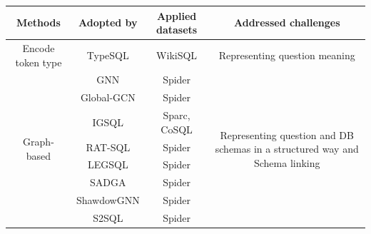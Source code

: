 \begin{table}
    \centering
    \begin{tabular}{|c|c|c|c|}
        \hline
        \rowcolor{Gray}
        \textbf{Methods}                & \textbf{Adopted by} & \textbf{Applied datasets} & \textbf{Addressed challenges}                                                                              \\
        \hline

        Encode token type               & TypeSQL             & WikiSQL                   & Representing question meaning                                                                              \\
        \hline
        \multirow{8}{*}{Graph-based}    & GNN                 & Spider                    & \multirow{8}{*}{\parbox{5cm}{Representing question and DB schemas in a structured way and Schema linking}} \\
                                        & Global-GCN          & Spider                    &                                                                                                            \\
                                        & IGSQL               & Sparc, CoSQL              &                                                                                                            \\
                                        & RAT-SQL             & Spider                    &                                                                                                            \\
                                        & LEGSQL              & Spider                    &                                                                                                            \\
                                        & SADGA               & Spider                    &                                                                                                            \\
                                        & ShawdowGNN          & Spider                    &                                                                                                            \\
                                        & S2SQL               & Spider                    &                                                                                                            \\

\end{tabular}
\end{table}

